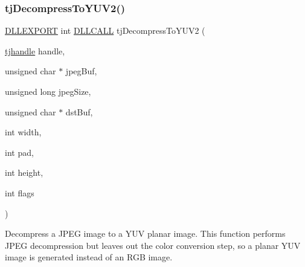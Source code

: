 \mbox{\label{group___turbo_j_p_e_g_ga7c08b340ad7f8e85d407bd9e81d44d07}} 
\subsubsection{\texorpdfstring{tj\+Decompress\+To\+Y\+U\+V2()}{tjDecompressToYUV2()}}
{\footnotesize\ttfamily \hyperlink{turbojpeg_8h_a808e08638be3cba36e36759e5b150de0}{D\+L\+L\+E\+X\+P\+O\+RT} int \hyperlink{turbojpeg_8h_a54b25836118bfac94a53a7b790f3ccb2}{D\+L\+L\+C\+A\+LL} tj\+Decompress\+To\+Y\+U\+V2 (\begin{DoxyParamCaption}\item[{\hyperlink{group___turbo_j_p_e_g_ga758d2634ecb4949de7815cba621f5763}{tjhandle}}]{handle,  }\item[{unsigned char $\ast$}]{jpeg\+Buf,  }\item[{unsigned long}]{jpeg\+Size,  }\item[{unsigned char $\ast$}]{dst\+Buf,  }\item[{int}]{width,  }\item[{int}]{pad,  }\item[{int}]{height,  }\item[{int}]{flags }\end{DoxyParamCaption})}

Decompress a J\+P\+EG image to a Y\+UV planar image. This function performs J\+P\+EG decompression but leaves out the color conversion step, so a planar Y\+UV image is generated instead of an R\+GB image.


